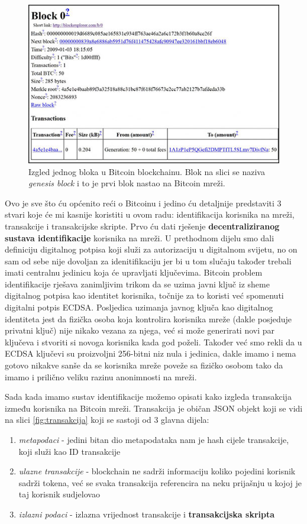 \documentclass[a4paper,oneside,12pt]{memoir} %
\begin{document}
\begin{figure}[H]
\centering
\includegraphics[scale=0.5]{genisis_block}
\caption{Izgled jednog bloka u Bitcoin blockchainu. Blok na slici se naziva \textit{genesis block} i to je prvi blok nastao na Bitcoin mreži.}
\end{figure}

Ovo je sve što ću općenito reći o Bitcoinu i jedino ću detaljnije predstaviti 3 stvari koje će mi kasnije koristiti u ovom radu: identifikacija korisnika na mreži, transakcije i transakcijske skripte. Prvo ću dati rješenje \textbf{decentraliziranog sustava identifikacije} korisnika na mreži. U prethodnom dijelu smo dali definiciju digitalnog potpisa koji služi za autorizaciju u digitalnom svijetu, no on sam od sebe nije dovoljan za idenitifikaciju jer bi u tom slučaju također trebali imati centralnu jedinicu koja će upravljati ključevima. Bitcoin problem identifikacije rješava zanimljivim trikom da se uzima javni ključ iz sheme digitalnog potpisa kao identitet korisnika, točnije za to koristi već spomenuti digitalni potpis ECDSA. Posljedica uzimanja javnog ključa kao digitalnog identiteta jest da fizička osoba koja kontrolira korisnika mreže (dakle posjeduje privatni ključ) nije nikako vezana za njega, već si može generirati novi par ključeva i stvoriti si novoga korisnika kada god poželi. Također već smo rekli da u ECDSA ključevi su proizvoljni 256-bitni niz nula i jedinica, dakle imamo i nema gotovo nikakve sanše da se korisnika mreže poveže sa fizičko osobom tako da imamo i prilično veliku razinu anonimnosti na mreži.

Sada kada imamo sustav identifikacije možemo opisati kako izgleda transakcija između korisnika na Bitcoin mreži. Transakcija je običan JSON objekt koji se vidi na slici \ref{fig:transakcija} koji se sastoji od 3 glavna dijela:
\begin{enumerate}
    \item \textit{metapodaci} - jedini bitan dio metapodataka nam je hash cijele transakcije, koji služi kao ID transakcije
    \item\textit{ulazne transakcije} - blockchain ne sadrži informaciju koliko pojedini korisnik sadrži tokena, već se svaka transakcija referencira na neku prijašnju u kojoj je taj korisnik sudjelovao
    \item \textit{izlazni podaci} - izlazna vrijednost transakcije i \textbf{transakcijska skripta}
\end{enumerate}
\end{document}
